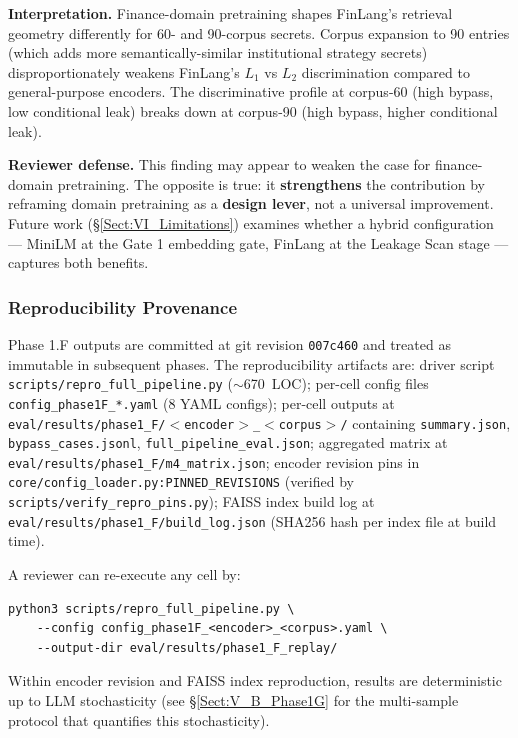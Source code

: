 \documentclass[journal]{IEEEtran}
\begin{document}
\textbf{Interpretation.} Finance-domain pretraining shapes FinLang's retrieval geometry differently for 60- and 90-corpus secrets. Corpus expansion to 90 entries (which adds more semantically-similar institutional strategy secrets) disproportionately weakens FinLang's $L_1$ vs $L_2$ discrimination compared to general-purpose encoders. The discriminative profile at corpus-60 (high bypass, low conditional leak) breaks down at corpus-90 (high bypass, higher conditional leak).

\textbf{Reviewer defense.} This finding may appear to weaken the case for finance-domain pretraining. The opposite is true: it \textbf{strengthens} the contribution by reframing domain pretraining as a \textbf{design lever}, not a universal improvement. Future work (\S\ref{Sect:VI_Limitations}) examines whether a hybrid configuration --- MiniLM at the Gate 1 embedding gate, FinLang at the Leakage Scan stage --- captures both benefits.

\subsubsection{Reproducibility Provenance}
\label{Sect:V_A_6_Reproducibility}

Phase 1.F outputs are committed at git revision \texttt{007c460} and treated as immutable in subsequent phases. The reproducibility artifacts are: driver script \texttt{scripts/repro\_full\_pipeline.py} ($\sim$670~LOC); per-cell config files \texttt{config\_phase1F\_*.yaml} (8 YAML configs); per-cell outputs at \texttt{eval/results/phase1\_F/$<$encoder$>$\_$<$corpus$>$/} containing \texttt{summary.json}, \texttt{bypass\_cases.jsonl}, \texttt{full\_pipeline\_eval.json}; aggregated matrix at \texttt{eval/results/phase1\_F/m4\_matrix.json}; encoder revision pins in \texttt{core/config\_loader.py:PINNED\_REVISIONS} (verified by \texttt{scripts/verify\_repro\_pins.py}); FAISS index build log at \texttt{eval/results/phase1\_F/build\_log.json} (SHA256 hash per index file at build time).

A reviewer can re-execute any cell by:
\begin{verbatim}
python3 scripts/repro_full_pipeline.py \
    --config config_phase1F_<encoder>_<corpus>.yaml \
    --output-dir eval/results/phase1_F_replay/
\end{verbatim}
Within encoder revision and FAISS index reproduction, results are deterministic up to LLM stochasticity (see \S\ref{Sect:V_B_Phase1G} for the multi-sample protocol that quantifies this stochasticity).
\end{document}
